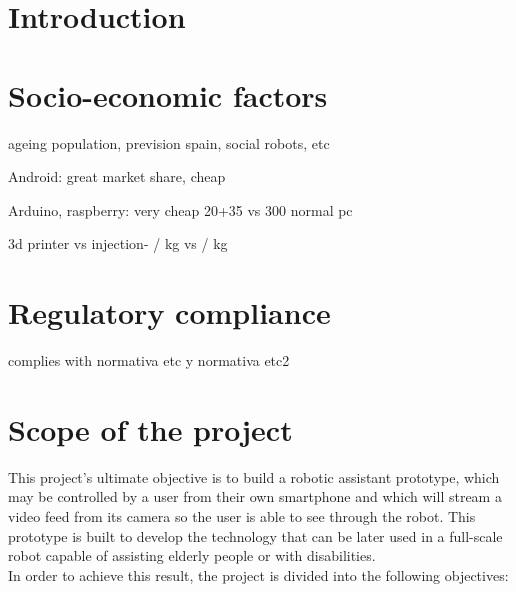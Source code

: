 \section{Introduction}




\section{Socio-economic factors}

ageing population, prevision spain, social robots, etc


Android: great market share, cheap

Arduino, raspberry: very cheap 20+35  vs 300 normal pc

3d printer vs injection- / kg vs / kg




\section{Regulatory compliance}

complies with normativa etc y normativa etc2

\section{Scope of the project}

This project's ultimate objective is to build a robotic assistant prototype, which may be controlled by a user from their own smartphone and which will stream a video feed from its camera so the user is able to see through the robot. This prototype is built to develop the technology that can be later used in a full-scale robot capable of assisting elderly people or with disabilities.\\

In order to achieve this result, the project is divided into the following objectives:

